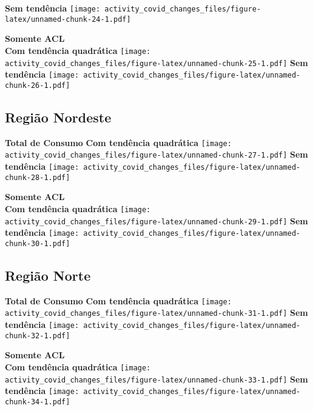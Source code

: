\documentclass[
]{article}
\begin{document}
\textbf{Sem tendência}
\texttt{[image: activity\_covid\_changes\_files/figure-latex/unnamed-chunk-24-1.pdf]}

\pagebreak

\textbf{Somente ACL}\\
\textbf{Com tendência quadrática}
\texttt{[image: activity\_covid\_changes\_files/figure-latex/unnamed-chunk-25-1.pdf]}
\textbf{Sem tendência}
\texttt{[image: activity\_covid\_changes\_files/figure-latex/unnamed-chunk-26-1.pdf]}

\pagebreak

\hypertarget{regiuxe3o-nordeste-1}{%
\subsection{Região Nordeste}\label{regiuxe3o-nordeste-1}}

\textbf{Total de Consumo} \textbf{Com tendência quadrática}
\texttt{[image: activity\_covid\_changes\_files/figure-latex/unnamed-chunk-27-1.pdf]}
\textbf{Sem tendência}
\texttt{[image: activity\_covid\_changes\_files/figure-latex/unnamed-chunk-28-1.pdf]}

\pagebreak

\textbf{Somente ACL}\\
\textbf{Com tendência quadrática}
\texttt{[image: activity\_covid\_changes\_files/figure-latex/unnamed-chunk-29-1.pdf]}
\textbf{Sem tendência}
\texttt{[image: activity\_covid\_changes\_files/figure-latex/unnamed-chunk-30-1.pdf]}

\pagebreak

\hypertarget{regiuxe3o-norte-1}{%
\subsection{Região Norte}\label{regiuxe3o-norte-1}}

\textbf{Total de Consumo} \textbf{Com tendência quadrática}
\texttt{[image: activity\_covid\_changes\_files/figure-latex/unnamed-chunk-31-1.pdf]}
\textbf{Sem tendência}
\texttt{[image: activity\_covid\_changes\_files/figure-latex/unnamed-chunk-32-1.pdf]}

\pagebreak

\textbf{Somente ACL}\\
\textbf{Com tendência quadrática}
\texttt{[image: activity\_covid\_changes\_files/figure-latex/unnamed-chunk-33-1.pdf]}
\textbf{Sem tendência}
\texttt{[image: activity\_covid\_changes\_files/figure-latex/unnamed-chunk-34-1.pdf]}
\end{document}
